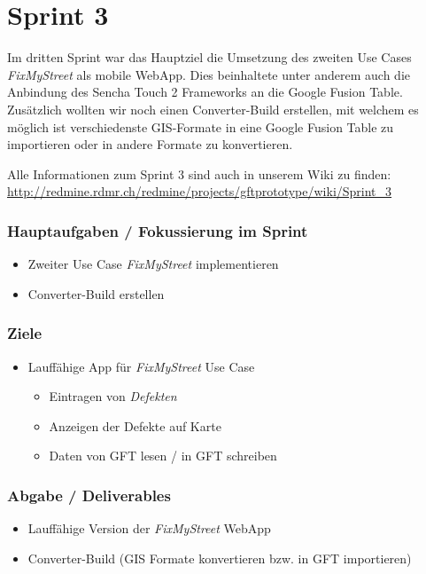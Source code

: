 \section{Sprint 3}

Im dritten Sprint war das Hauptziel die Umsetzung des zweiten Use Cases \emph{FixMyStreet} als mobile \gls{WebApp}. Dies beinhaltete unter anderem auch die Anbindung des Sencha Touch 2 Frameworks an die Google Fusion Table.
Zusätzlich wollten wir noch einen Converter-Build erstellen, mit welchem es möglich ist verschiedenste \gls{GIS}-Formate in eine Google Fusion Table zu importieren oder in andere Formate zu konvertieren.

Alle Informationen zum Sprint 3 sind auch in unserem Wiki zu finden:
\url{http://redmine.rdmr.ch/redmine/projects/gftprototype/wiki/Sprint_3}

\subsubsection{Hauptaufgaben / Fokussierung im Sprint}
\begin{itemize}
	\item Zweiter Use Case \emph{FixMyStreet} implementieren
	\item Converter-Build erstellen
\end{itemize}

\subsubsection{Ziele}
\begin{itemize}
	\item Lauffähige App für \emph{FixMyStreet} Use Case
	\begin{itemize}
		\item Eintragen von \emph{Defekten}
		\item Anzeigen der Defekte auf Karte
		\item Daten von GFT lesen / in GFT schreiben
	\end{itemize}
\end{itemize}

\subsubsection{Abgabe / Deliverables}
\begin{itemize}
	\item Lauffähige Version der \emph{FixMyStreet} \gls{WebApp}
	\item Converter-Build (\gls{GIS} Formate konvertieren bzw. in GFT importieren)
\end{itemize}

